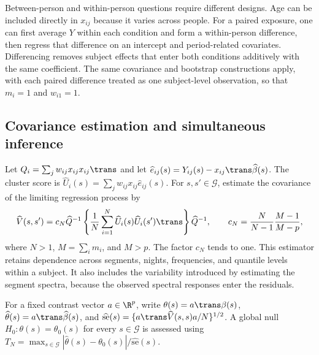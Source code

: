 Between-person and within-person questions require different designs. Age can be included directly in $x_{ij}$ because it varies across people. For a paired exposure, one can first average $Y$ within each condition and form a within-person difference, then regress that difference on an intercept and period-related covariates. Differencing removes subject effects that enter both conditions additively with the same coefficient. The same covariance and bootstrap constructions apply, with each paired difference treated as one subject-level observation, so that $m_i=1$ and $w_{i1}=1$.

\subsection{Covariance estimation and simultaneous inference}
Let $Q_i=\sum_jw_{ij}x_{ij}x_{ij}\trans$ and let $\widehat e_{ij}(s)=Y_{ij}(s)-x_{ij}\trans\widehat\beta(s)$. The cluster score is $\widehat U_i(s)=\sum_jw_{ij}x_{ij}\widehat e_{ij}(s)$. For $s,s'\in\mathcal G$, estimate the covariance of the limiting regression process by
\begin{equation}\label{eq:sandwich}
 \widehat V(s,s')=c_N\widehat Q^{-1}
 \left\{\frac1N\sum_{i=1}^N\widehat U_i(s)\widehat U_i(s')\trans\right\}
 \widehat Q^{-1},
 \qquad c_N=\frac{N}{N-1}\frac{M-1}{M-p},
\end{equation}
where $N>1$, $M=\sum_i m_i$, and $M>p$. The factor $c_N$ tends to one. This estimator retains dependence across segments, nights, frequencies, and quantile levels within a subject. It also includes the variability introduced by estimating the segment spectra, because the observed spectral responses enter the residuals.

For a fixed contrast vector $a\in\R^p$, write $\theta(s)=a\trans\beta(s)$, $\widehat\theta(s)=a\trans\widehat\beta(s)$, and $\widehat{\mathrm{se}}(s)=\{a\trans\widehat V(s,s)a/N\}^{1/2}$. A global null $H_0:\theta(s)=\theta_0(s)$ for every $s\in\mathcal G$ is assessed using $T_N=\max_{s\in\mathcal G}|\widehat\theta(s)-\theta_0(s)|/\widehat{\mathrm{se}}(s)$.


